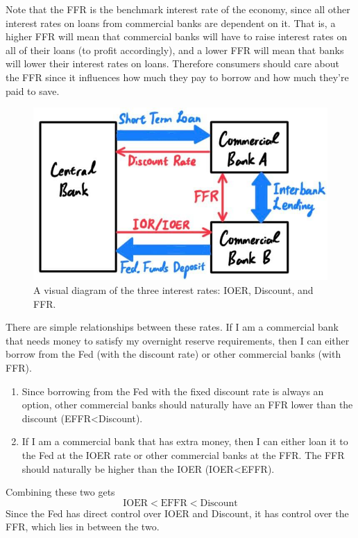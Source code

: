 \documentclass{article}
\begin{document}
    Note that the FFR is the benchmark interest rate of the economy, since all other interest rates on loans from commercial banks are dependent on it. That is, a higher FFR will mean that commercial banks will have to raise interest rates on all of their loans (to profit accordingly), and a lower FFR will mean that banks will lower their interest rates on loans. Therefore consumers should care about the FFR since it influences how much they pay to borrow and how much they're paid to save. 

    \begin{figure}[H]
      \centering 
      \includegraphics[scale=0.3]{img/3_Interest_Rates.jpg}
      \caption{A visual diagram of the three interest rates: IOER, Discount, and FFR. } 
      \label{fig:3_Interest_Rates}
    \end{figure}

    \begin{theorem}[FFR]
      There are simple relationships between these rates. If I am a commercial bank that needs money to satisfy my overnight reserve requirements, then I can either borrow from the Fed (with the discount rate) or other commercial banks (with FFR). 
      \begin{enumerate}
        \item Since borrowing from the Fed with the fixed discount rate is always an option, other commercial banks should naturally have an FFR lower than the discount (EFFR<Discount).
        \item If I am a commercial bank that has extra money, then I can either loan it to the Fed at the IOER rate or other commercial banks at the FFR. The FFR should naturally be higher than the IOER (IOER<EFFR). 
      \end{enumerate}
      Combining these two gets 
      \begin{equation}
        \text{IOER} < \text{EFFR} < \text{Discount}
      \end{equation}
      Since the Fed has direct control over IOER and Discount, it has control over the FFR, which lies in between the two. 
    \end{theorem}
\end{document}
